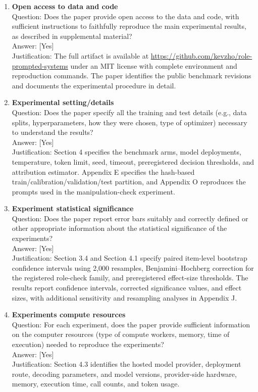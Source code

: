 \begin{enumerate}[leftmargin=*]
\item \textbf{Open access to data and code}\\
Question: Does the paper provide open access to the data and code, with sufficient instructions to
faithfully reproduce the main experimental results, as described in supplemental material?\\
Answer: [Yes]\\
Justification: The full artifact is available at
\url{https://github.com/kevzho/role-prompted-systems} under an MIT license with
complete environment and reproduction commands. The paper identifies the public benchmark revisions
and documents the experimental procedure in detail.

\item \textbf{Experimental setting/details}\\
Question: Does the paper specify all the training and test details (e.g., data splits,
hyperparameters, how they were chosen, type of optimizer) necessary to understand the results?\\
Answer: [Yes]\\
Justification: Section 4 specifies the benchmark arms, model deployments, temperature, token limit,
seed, timeout, preregistered decision thresholds, and attribution estimator. Appendix E specifies the
hash-based train/calibration/validation/test partition, and Appendix O reproduces the prompts used in
the manipulation-check experiment.

\item \textbf{Experiment statistical significance}\\
Question: Does the paper report error bars suitably and correctly defined or other appropriate
information about the statistical significance of the experiments?\\
Answer: [Yes]\\
Justification: Section 3.4 and Section 4.1 specify paired item-level bootstrap confidence intervals
using 2,000 resamples, Benjamini--Hochberg correction for the registered role-check family, and
preregistered effect-size thresholds. The results report confidence intervals, corrected significance
values, and effect sizes, with additional sensitivity and resampling analyses in Appendix J.

\item \textbf{Experiments compute resources}\\
Question: For each experiment, does the paper provide sufficient information on the computer
resources (type of compute workers, memory, time of execution) needed to reproduce the experiments?\\
Answer: [Yes]\\
Justification: Section 4.3 identifies the hosted model provider, deployment route, decoding
parameters, and model versions, provider-side hardware, memory, execution time, call counts, and
token usage.


\end{enumerate}
